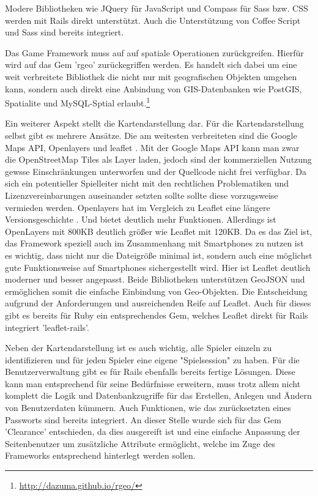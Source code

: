 Modere Bibliotheken wie JQuery für JavaScript und Compass für Sass bzw. CSS werden mit Rails direkt unterstützt. Auch die Unterstützung von Coffee Script und Sass sind bereits integriert.

Das Game Framework muss auf auf spatiale Operationen zurückgreifen. Hierfür wird auf das Gem 'rgeo' zurückegriffen werden. Es handelt sich dabei um eine weit verbreitete Bibliothek die nicht nur mit geografischen Objekten umgehen kann, sondern auch direkt eine Anbindung von GIS-Datenbanken wie PostGIS, Spatialite und MySQL-Sptial erlaubt.\footnote{\url{http://dazuma.github.io/rgeo/}}

Ein weiterer Aspekt stellt die Kartendarstellung dar. Für die Kartendarstellung selbst gibt es mehrere Ansätze. Die am weitesten verbreiteten sind die Google Maps API, Openlayers und leaflet \cite{Derrough.2013}. Mit der Google Maps API kann man zwar die OpenStreetMap Tiles als Layer laden, jedoch sind der kommerziellen Nutzung gewsse Einschränkungen unterworfen und der Quellcode nicht frei verfügbar. Da sich ein potentieller Spielleiter nicht mit den rechtlichen Problematiken und Lizenzvereinbarungen auseinander setzten sollte sollte diese vorzugsweise vermieden werden. Openlayers hat im Vergleich zu Leaflet eine längere Versionsgeschichte \cite{Ohloh.2014}. Und bietet deutlich mehr Funktionen. Allerdings ist OpenLayers mit 800KB deutlich größer wie Leaflet mit 120KB. Da es das Ziel ist, das Framework speziell auch im Zusammenhang mit Smartphones zu nutzen ist es wichtig, dass nicht nur die Dateigröße minimal ist, sondern auch eine möglichst gute Funktionsweise auf Smartphones sichergestellt wird. Hier ist Leaflet deutlich moderner und besser angepasst. Beide Bibliotheken unterstützen GeoJSON und ermöglichen somit die einfache Einbindung von Geo-Objekten. Die Entscheidung aufgrund der Anforderungen und ausreichenden Reife auf Leaflet. Auch für dieses gibt es bereits für Ruby ein entsprechendes Gem, welches Leaflet direkt für Rails integriert 'leaflet-rails'.

Neben der Kartendarstellung ist es auch wichtig, alle Spieler einzeln zu identifizieren und für jeden Spieler eine eigene "Spielsession" zu haben. Für die Benutzerverwaltung gibt es für Rails ebenfalls bereits fertige Lösungen. Diese kann man entsprechend für seine Bedürfnisse erweitern, muss trotz allem nicht komplett die Logik und Datenbankzugriffe für das Erstellen, Anlegen und Ändern von Benutzerdaten kümmern. Auch Funktionen, wie das zurücksetzten eines Passworts sind bereits integriert. An dieser Stelle wurde sich für das Gem 'Clearance' entschieden, da dies ausgereift ist und eine einfache Anpassung der Seitenbenutzer um zusätzliche Attribute ermöglicht, welche im Zuge des Frameworks entsprechend hinterlegt werden sollen.

